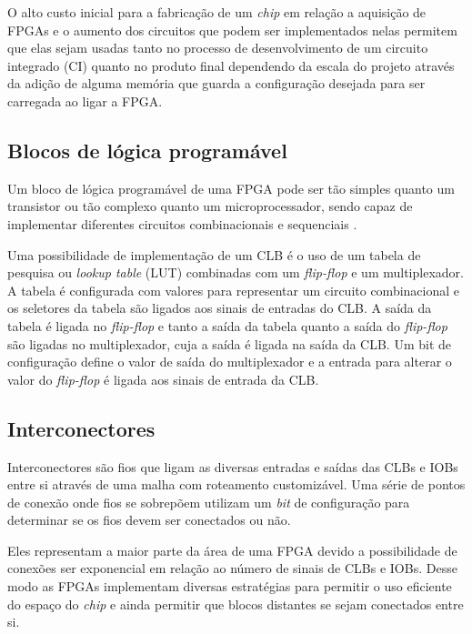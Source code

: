 O alto custo inicial para a fabricação de um \emph{chip} em relação a aquisição de FPGAs e o aumento dos
circuitos que podem ser implementados nelas permitem que elas sejam usadas tanto no processo de 
desenvolvimento de um circuito integrado (CI) quanto no produto final dependendo da escala do projeto
através da adição de alguma memória que guarda a configuração desejada para ser carregada ao ligar a FPGA.

\subsection{Blocos de lógica programável }
\label{sec:clb}

Um bloco de lógica programável de uma FPGA pode ser tão simples quanto um transistor ou tão complexo quanto um
microprocessador, sendo capaz de implementar diferentes circuitos combinacionais e sequenciais \citep{rose1993architecture}.

Uma possibilidade de implementação de um CLB é o uso de um tabela de pesquisa ou \emph{lookup table} (LUT) combinadas com um
\emph{flip-flop} e um multiplexador. A tabela é configurada com valores para representar um circuito combinacional e os seletores da tabela
são ligados aos sinais de entradas do CLB. A saída da tabela é ligada no \emph{flip-flop} e tanto a saída da tabela quanto a saída do \emph{flip-flop} são
ligadas no multiplexador, cuja a saída é ligada na saída da CLB. Um bit de configuração define o valor de saída do multiplexador e a entrada para
alterar o valor do \emph{flip-flop} é ligada aos sinais de entrada da CLB.


\subsection{Interconectores}
\label{sec:inter}

Interconectores são fios que ligam as diversas entradas e saídas das CLBs e IOBs entre si através de uma malha com roteamento customizável.
Uma série de pontos de conexão onde fios se sobrepõem utilizam um \emph{bit} de configuração para determinar se os fios devem ser conectados ou não.

Eles representam a maior parte da área de uma FPGA devido a possibilidade de conexões ser exponencial em relação ao número de sinais de CLBs e IOBs.
Desse modo as FPGAs implementam diversas estratégias para permitir o uso eficiente do espaço do \emph{chip} e ainda permitir que blocos distantes 
se sejam conectados entre si.

